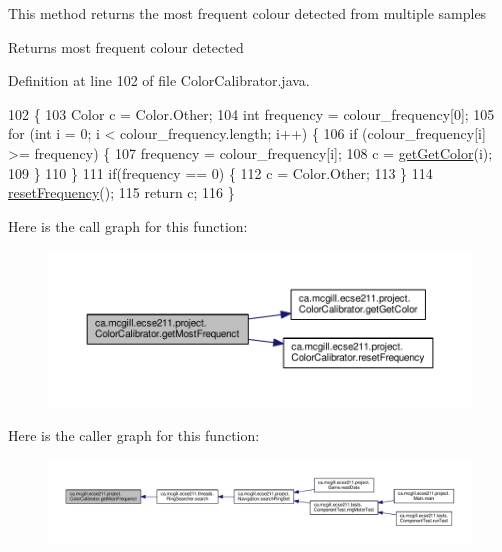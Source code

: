 This method returns the most frequent colour detected from multiple samples

\begin{DoxyReturn}{Returns}
most frequent colour detected 
\end{DoxyReturn}


Definition at line 102 of file Color\+Calibrator.\+java.


\begin{DoxyCode}
102                                          \{
103     Color c = Color.Other;
104     \textcolor{keywordtype}{int} frequency = colour\_frequency[0];
105     \textcolor{keywordflow}{for} (\textcolor{keywordtype}{int} i = 0; i < colour\_frequency.length; i++) \{
106       \textcolor{keywordflow}{if} (colour\_frequency[i] >= frequency) \{
107         frequency = colour\_frequency[i];
108         c = \hyperlink{classca_1_1mcgill_1_1ecse211_1_1project_1_1_color_calibrator_acb1d9cef0739971dbe00cc16712be0fe}{getGetColor}(i);
109       \}
110     \}
111     \textcolor{keywordflow}{if}(frequency == 0) \{
112       c = Color.Other;
113     \}
114     \hyperlink{classca_1_1mcgill_1_1ecse211_1_1project_1_1_color_calibrator_ab6148d75e3a105016580e90ed1ea9bc9}{resetFrequency}();
115     \textcolor{keywordflow}{return} c;
116   \}
\end{DoxyCode}
Here is the call graph for this function\+:
\nopagebreak
\begin{figure}[H]
\begin{center}
\leavevmode
\includegraphics[width=350pt]{classca_1_1mcgill_1_1ecse211_1_1project_1_1_color_calibrator_a3d65927aaa2041f933dbdc19c3d2a412_cgraph}
\end{center}
\end{figure}
Here is the caller graph for this function\+:
\nopagebreak
\begin{figure}[H]
\begin{center}
\leavevmode
\includegraphics[width=350pt]{classca_1_1mcgill_1_1ecse211_1_1project_1_1_color_calibrator_a3d65927aaa2041f933dbdc19c3d2a412_icgraph}
\end{center}
\end{figure}
